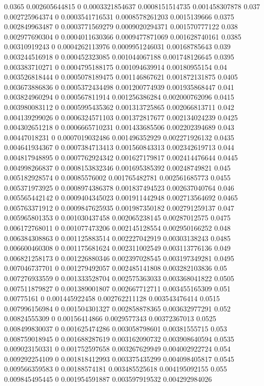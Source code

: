 {0.0365 0.002605644815 0 0.0003321854637 0.0008151514735 0.001458307878
0.037 0.002725964374 0 0.0003541716531 0.0008578261203 0.0015139666
0.0375 0.002849963487 0 0.0003771569279 0.0009020294371 0.001570777122
0.038 0.002977690304 0 0.0004011630366 0.0009477871069 0.001628740161
0.0385 0.00310919243 0 0.0004262113976 0.0009951246031 0.00168785643
0.039 0.003244516918 0 0.000452323085 0.001044067188 0.001748126645
0.0395 0.003383710271 0 0.0004795188175 0.001094639914 0.00180955154
0.04 0.003526818444 0 0.0005078189475 0.001146867621 0.001872131875
0.0405 0.003673886836 0 0.0005372434498 0.001200774939 0.001935868447
0.041 0.003824960294 0 0.000567811914 0.001256386284 0.002000762096
0.0415 0.003980083112 0 0.0005995435362 0.001313725865 0.002066813711
0.042 0.004139299026 0 0.0006324571103 0.001372817677 0.002134024239
0.0425 0.004302651218 0 0.0006665710231 0.001433685506 0.002202394689
0.043 0.00447018231 0 0.0007019032486 0.001496352929 0.002271926132
0.0435 0.004641934367 0 0.0007384713413 0.001560843313 0.002342619713
0.044 0.004817948895 0 0.0007762924342 0.001627179817 0.002414476644
0.0445 0.004998266837 0 0.0008153832346 0.001695385392 0.00248749821
0.045 0.005182928574 0 0.00085576002 0.001765482781 0.002561685773
0.0455 0.005371973925 0 0.0008974386378 0.001837494523 0.002637040764
0.046 0.005565442142 0 0.0009404345023 0.001911442948 0.002713564692
0.0465 0.005763371912 0 0.0009847625935 0.001987350182 0.002791259137
0.047 0.005965801353 0 0.001030437458 0.002065238145 0.00287012575
0.0475 0.006172768011 0 0.001077473206 0.002145128554 0.002950166252
0.048 0.006384308863 0 0.001125883514 0.002227042919 0.00303138243
0.0485 0.006600460308 0 0.001175681624 0.002311002549 0.003113776136
0.049 0.006821258173 0 0.001226880346 0.002397028545 0.003197349281
0.0495 0.007046737701 0 0.001279492057 0.002485141808 0.003282103836
0.05 0.007276933559 0 0.001333528704 0.002575363033 0.003368041822
0.0505 0.007511879827 0 0.001389001807 0.002667712711 0.003455165309
0.051 0.00775161 0 0.001445922458 0.002762211128 0.003543476414
0.0515 0.007996156984 0 0.001504301327 0.002858878365 0.003632977291
0.052 0.00824555309 0 0.00156414866 0.0029577343 0.00372367013
0.0525 0.008499830037 0 0.001625474286 0.003058798601 0.00381555715
0.053 0.008759018945 0 0.001688287619 0.003162090732 0.003908640594
0.0535 0.009023150331 0 0.001752597658 0.003267629949 0.004002922724
0.054 0.009292254109 0 0.001818412993 0.003375435299 0.004098405817
0.0545 0.009566359583 0 0.00188574181 0.003485525618 0.004195092155
0.055 0.009845495445 0 0.001954591887 0.003597919532 0.004292984026
}
